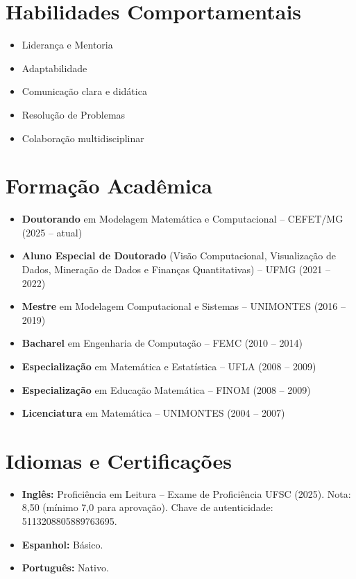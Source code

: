 \documentclass[a4paper,10pt]{article}
\begin{document}
\section*{Habilidades Comportamentais}
\begin{itemize}[leftmargin=*]
    \item Liderança e Mentoria
    \item Adaptabilidade
    \item Comunicação clara e didática
    \item Resolução de Problemas
    \item Colaboração multidisciplinar
\end{itemize}

\section*{Formação Acadêmica}
\begin{itemize}[leftmargin=*]
    \item \textbf{Doutorando} em Modelagem Matemática e Computacional -- CEFET/MG (2025 -- atual)
    \item \textbf{Aluno Especial de Doutorado} (Visão Computacional, Visualização de Dados, Mineração de Dados e Finanças Quantitativas) -- UFMG (2021 -- 2022)
    \item \textbf{Mestre} em Modelagem Computacional e Sistemas -- UNIMONTES (2016 -- 2019)
    \item \textbf{Bacharel} em Engenharia de Computação -- FEMC (2010 -- 2014)
    \item \textbf{Especialização} em Matemática e Estatística -- UFLA (2008 -- 2009)
    \item \textbf{Especialização} em Educação Matemática -- FINOM (2008 -- 2009)
    \item \textbf{Licenciatura} em Matemática -- UNIMONTES (2004 -- 2007)
\end{itemize}

\section*{Idiomas e Certificações}
\begin{itemize}[leftmargin=*]
    \item \textbf{Inglês:} Proficiência em Leitura -- Exame de Proficiência UFSC (2025). Nota: 8,50 (mínimo 7,0 para aprovação). Chave de autenticidade: 5113208805889763695.
    \item \textbf{Espanhol:} Básico.
    \item \textbf{Português:} Nativo.
\end{itemize}
\end{document}
